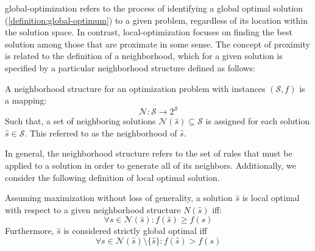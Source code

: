 \acrshort{global-optimization} refers to the process of identifying a global
optimal solution (\ref{definition:global-optimum}) to a given problem,
regardless of its location within the solution space. In contrast,
\acrshort{local-optimization} focuses on finding the best solution among those
that are proximate in some sense. The concept of proximity is related to the
definition of a neighborhood, which for a given solution is specified by a
particular neighborhood structure defined as follows:

\begin{definition}
    \label{definition:neighborhood-structure}
    A neighborhood structure for an optimization problem with instances $(\mathcal{S}, f)$ is a mapping:
    \begin{equation}
        \label{equation:neighborhood-structure}
        \mathcal{N} \colon \mathcal{S} \longrightarrow 2^{\mathcal{S}}
    \end{equation}
    Such that, a set of neighboring solutions $\mathcal{N}(\hat{s}) \subseteq
        \mathcal{S}$ is assigned for each solution $\hat{s} \in \mathcal{S}$.
    This referred to as the neighborhood of $\hat{s}$.
\end{definition}

In general, the neighborhood structure refers to the set of rules that
must be applied to a solution in order to generate all of its neighbors.
Additionally, we consider the following definition of local optimal solution.

\begin{definition}
    \label{definition:local-optimum}
    Assuming maximization without loss of generality, a solution $\hat{s}$ is
    local optimal with respect to a given neighborhood structure $N(\hat{s})$
    iff:
    \begin{equation}
        \label{equation:local-maximum}
        \forall s \in \mathcal{N}(\hat{s}) \colon f(\hat{s}) \geq f(s)
    \end{equation}
    Furthermore, $\hat{s}$ is considered strictly global optimal iff
    \begin{equation}
        \label{equation:strict-local-maximum}
        \forall s \in \mathcal{N}(\hat{s}) \setminus \{\hat{s}\} \colon f(\hat{s}) > f(s)
    \end{equation}
\end{definition}

